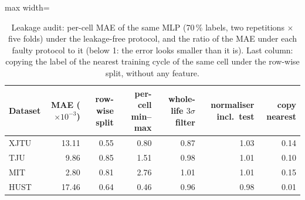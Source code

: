 \begin{table}[t]\centering\small
\caption{Leakage audit: per-cell MAE of the same MLP (70\,\% labels, two repetitions $\times$ five folds) under the leakage-free protocol, and the ratio of the MAE under each faulty protocol to it (below 1: the error looks smaller than it is). Last column: copying the label of the nearest training cycle of the same cell under the row-wise split, without any feature.}\label{tab:leak}
\begin{adjustbox}{max width=\textwidth}\begin{tabular}{lrrrrrr}\toprule
Dataset & MAE ($\times10^{-3}$) & row-wise split & per-cell min--max & whole-life $3\sigma$ filter & normaliser incl.\ test & copy nearest \\\midrule
XJTU & 13.11 & 0.55 & 0.80 & 0.87 & 1.03 & 0.14 \\
TJU & 9.86 & 0.85 & 1.51 & 0.98 & 1.01 & 0.10 \\
MIT & 2.80 & 0.81 & 2.76 & 1.01 & 1.01 & 0.15 \\
HUST & 17.46 & 0.64 & 0.46 & 0.96 & 0.98 & 0.01 \\
\bottomrule\end{tabular}\end{adjustbox}\end{table}
